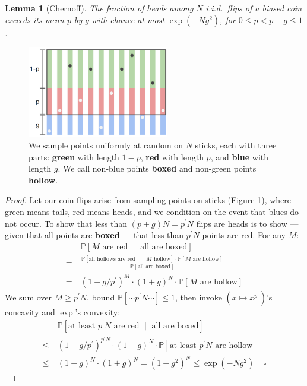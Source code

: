 \documentclass[11pt, justified]{tufte-book}
\newcommand{\Pp}{\mathbb{P}}\newcommand{\pP}{\mathcal{P}}
\newtheorem*{lem}{Lemma}
\theoremstyle{definition}
\begin{document}
        \begin{lem}[Chernoff]
            The fraction of heads among $N$ i.i.d.\ flips of a biased coin
            exceeds its mean $p$ by $g$ with chance at most 
            $\exp(-Ng^2)$, for $0 \leq p < p+g \leq 1$.
        \end{lem}
        \begin{figure}[h]
            \centering
            \includegraphics[height=4cm, clip]{figures/chernoff}
            \caption{{
                We sample points uniformly at random on $N$
                sticks, each with three parts: \textbf{green}
                with length $1-p$, \textbf{red} with length $p$, and
                \textbf{blue} with length $g$.  We call non-blue points
                \textbf{boxed} and non-green points \textbf{hollow}.
            }}
            \label{fig:chernoff}
        \end{figure}
        \begin{proof} \renewcommand{\qedsymbol}{}
            Let our coin flips arise from sampling points on sticks
            (Figure \ref{fig:chernoff}), where green means tails, red
            means heads, and we condition on the event that blues do not occur.
            To show that less than $(p+g)N = p^\prime N$ flips are
            heads is to show --- given that all points are \textbf{boxed} ---
            that less than $p^\prime N$ points are red. 
            For any $M$:
            {%
            \begin{align*}
                    & ~ \Pp[\text{$M$ are red $\mid$ all are boxed}] \\
                  = & ~ \frac{\Pp[\text{all hollows are red $\mid$ $M$ hollow}] \cdot \Pp[\text{$M$ are hollow}]}{\Pp[\text{all are boxed}] } \\
                  = & ~ (1 - g/p^\prime)^{M} \cdot (1+g)^{N} \cdot \Pp[\text{$M$ are hollow}]
            \end{align*}
            }%
            We sum over $M\geq p^\prime N$, bound $\Pp[\cdots p^\prime N \cdots] \leq 1$,
            then invoke $(x \mapsto x^{p^\prime})$'s concavity and
            $\exp$'s convexity:
            \begin{align*}
                &~\Pp[\text{at least $p^\prime N$ are red $\mid$ all are boxed}]
                \\ \leq
                &~(1 - g/p^\prime)^{p^\prime N} \cdot (1+g)^{N} \cdot \Pp[\text{at least $p^\prime N$ are hollow}]
                \\ \leq
                &~(1 - g)^N \cdot (1 + g)^{N}
                =
                (1 - g^2)^N
                \leq
                \exp(- Ng^2)
                ~~~~~\square
            \end{align*}
        \end{proof}
\end{document}
